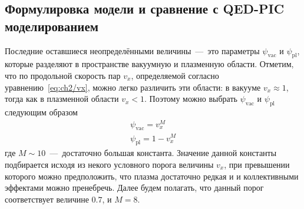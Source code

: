 \subsection{Формулировка модели и сравнение с QED-PIC моделированием}
\label{sub:ch2/sec3/Discussion}

Последние оставшиеся неопределёнными величины~---~это параметры $\psi_\mathrm{vac}$ и $\psi_\mathrm{pl}$, которые разделяют в пространстве вакуумную и плазменную области.
Отметим, что по продольной скорость пар $v_x$, определяемой согласно уравнению~\eqref{eq:ch2/vx}, можно легко различить эти области: в вакууме $v_x\approx 1$, тогда как в плазменной области $v_x < 1$.
Поэтому можно выбрать $\psi_\mathrm{vac}$ и $\psi_\mathrm{pl}$ следующим образом
\begin{align}
    \psi_\mathrm{vac} = v_x^M \\
    \psi_\mathrm{pl} =  1 - v_x^M
\end{align}
где $M\sim 10$~---~достаточно большая константа.
Значение данной константы подбирается исходя из некого условного порога величины $v_x$, при превышении которого можно предположить, что плазма достаточно редкая и и коллективными эффектами можно пренебречь.
Далее будем полагать, что данный порог соответствует величине $0.7$, и $M=8$.

